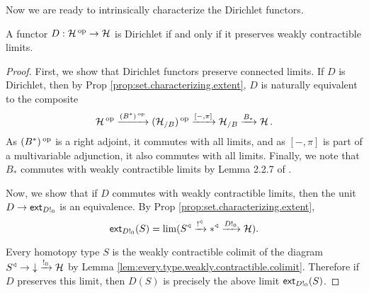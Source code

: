 Now we are ready to intrinsically characterize the Dirichlet functors.
\begin{thm}
A functor $D : \operatorname{\mathcal{H}}\operatorname{^\textnormal{op}} \to \operatorname{\mathcal{H}}$ is Dirichlet if and only if it preserves
weakly contractible limits. 
\end{thm}
\begin{proof}
First, we show that Dirichlet functors preserve connected limits. If $D$ is
Dirichlet, then by Prop \ref{prop:set.characterizing.extent}, $D$ is naturally
equivalent to the composite
$$\operatorname{\mathcal{H}}\operatorname{^\textnormal{op}} \xrightarrow{(B^{\ast})\operatorname{^\textnormal{op}}} (\operatorname{\mathcal{H}}_{/B})\operatorname{^\textnormal{op}} \xrightarrow{[-, \pi]} \operatorname{\mathcal{H}}_{/B}
\xrightarrow{B_\ast} \operatorname{\mathcal{H}}.$$
As $(B^{\ast})\operatorname{^\textnormal{op}}$ is a right adjoint, it commutes with all limits, and as $[-,\pi]$
is part of a multivariable adjunction, it also commutes with all limits.
Finally, we note that $B_{\ast}$ commutes with weakly contractible limits by
Lemma 2.2.7 of \cite{GHK:Analytic.Monads}.

Now, we show that if $D$ commutes with weakly contractible limits, then the unit
$D \to \operatorname{\mathsf{{ext}}}_{D!_0}$ is an equivalence. By Prop
\ref{prop:set.characterizing.extent}, 
  $$\operatorname{\mathsf{{ext}}}_{D!_0}(S) = \lim(S^{\triangleleft} \xrightarrow{!^{\triangleleft}} \ast^{\triangleleft}
  \xrightarrow{D!_0} \operatorname{\mathcal{H}}).$$
  
Every homotopy type $S$ is the weakly contractible colimit of the diagram $S^{\triangleleft} \to
\mathbin{\downarrow} \xrightarrow{!_0} \operatorname{\mathcal{H}}$ by Lemma \ref{lem:every.type.weakly.contractible.colimit}. Therefore if $D$ preserves this limit, then
$D(S)$ is precisely the above limit $\operatorname{\mathsf{{ext}}}_{D!_0}(S)$.
\end{proof}

